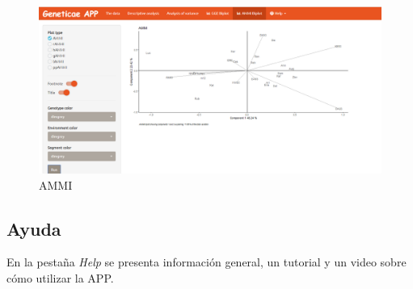 \begin{figure}[H]
	\begin{center}
		\includegraphics[width=16cm]{./Graficos/AMMI_S.png}
	\end{center}
	\caption{AMMI}
	\label{fig:fig4313}
\end{figure}


\subsection{Ayuda}

En la pestaña \emph{Help} se presenta información general, un tutorial y un video sobre  cómo utilizar la APP.
